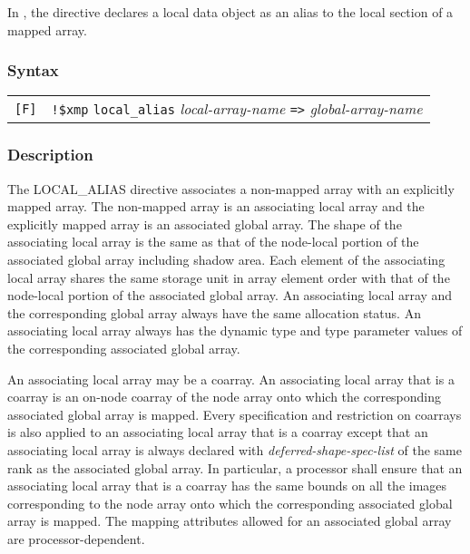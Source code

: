 In {\XMPF}, the {\tt {}} directive declares a
local data object as an alias to the local section of a mapped
array.

\subsubsection*{Syntax}

\begin{tabular}{ll}
\verb![F]! & \verb|!$xmp| {\tt local\_alias} {\it local-array-name}
\verb|=>| {\it global-array-name} \\
\end{tabular}

\subsubsection*{Description}

The LOCAL\_ALIAS directive associates a non-mapped array with
an explicitly mapped array.
The non-mapped array is an associating local array and
the explicitly mapped array is an associated global array.
The shape of the associating local array is the same as
that of the node-local portion of the associated global array
including shadow area.
Each element of the associating local array shares the 
same storage unit in array element order with that of the node-local portion 
of the associated global array.
An associating local array and the corresponding global array always have
the same allocation status.
An associating local array always has the dynamic type
and type parameter values of the corresponding 
associated global array.



An associating local array may be a coarray.
An associating local array that is a coarray is
an on-node coarray of the node array onto which the corresponding
associated global array is mapped.
Every specification and restriction on coarrays is also applied to an associating local
array that is a coarray except that
an associating local array is always declared with
{\it deferred-shape-spec-list} of the same rank as the associated global array.
In particular, a processor shall ensure that an associating local array 
that is a coarray has
the same bounds on all the images corresponding to the node array
onto which the corresponding associated global array is mapped.
The mapping attributes allowed for an associated global array are
processor-dependent.

